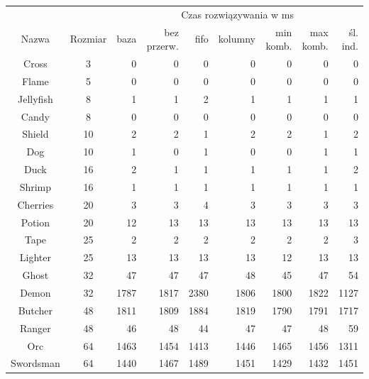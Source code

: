\begin{center}
    \begin{tabular}{|c|c|r r r r r r r|}
        \hline
        {}          & {}        & \multicolumn{7}{c|}{Czas rozwiązywania w ms} \\
        Nazwa       & Rozmiar   & baza & bez przerw. & fifo & kolumny & min komb. & max komb. & śl. ind. \\
        \hline
        Cross       & 3         & 0     & 0     & 0     & 0     & 0     & 0     & 0     \\
        Flame       & 5         & 0     & 0     & 0     & 0     & 0     & 0     & 0     \\
        Jellyfish   & 8         & 1     & 1     & 2     & 1     & 1     & 1     & 1     \\
        Candy       & 8         & 0     & 0     & 0     & 0     & 0     & 0     & 0     \\
        Shield      & 10        & 2     & 2     & 1     & 2     & 2     & 1     & 2     \\
        Dog         & 10        & 1     & 0     & 1     & 0     & 0     & 1     & 1     \\
        Duck        & 16        & 2     & 1     & 1     & 1     & 1     & 1     & 2     \\
        Shrimp      & 16        & 1     & 1     & 1     & 1     & 1     & 1     & 1     \\
        Cherries    & 20        & 3     & 3     & 4     & 3     & 3     & 3     & 3     \\
        Potion      & 20        & 12    & 13    & 13    & 13    & 13    & 13    & 13    \\
        Tape        & 25        & 2     & 2     & 2     & 2     & 2     & 2     & 3     \\
        Lighter     & 25        & 13    & 13    & 13    & 13    & 12    & 13    & 13    \\
        \hline
        Ghost       & 32        & 47    & 47    & 47    & 48    & 45    & 47    & 54    \\
        Demon       & 32        & 1787  & 1817  & 2380  & 1806  & 1800  & 1822  & 1127  \\
        Butcher     & 48        & 1811  & 1809  & 1884  & 1819  & 1790  & 1791  & 1717  \\
        Ranger      & 48        & 46    & 48    & 44    & 47    & 47    & 48    & 59    \\
        Orc         & 64        & 1463  & 1454  & 1413  & 1446  & 1465  & 1456  & 1311  \\
        Swordsman   & 64        & 1440  & 1467  & 1489  & 1451  & 1429  & 1432  & 1451  \\
        \hline
    \end{tabular}
\end{center}
